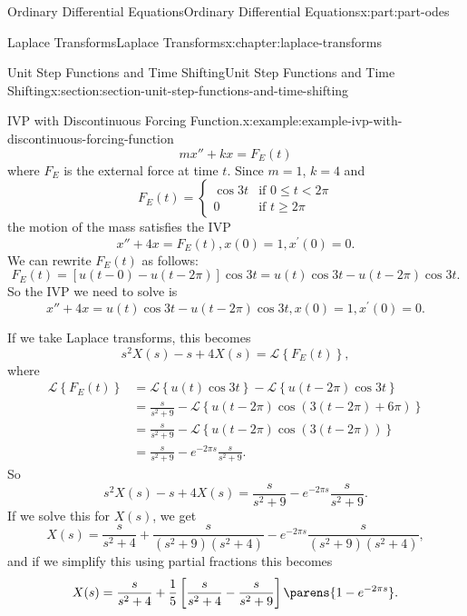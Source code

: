 \documentclass[oneside,10pt,]{book}
\numberwithin{equation}{part}
\newcommand{\Laplace}[1]{\mathcal{L}\left\{#1\right\}}
\newcommand{\lt}{<}
\newcommand{\amp}{&}
\begin{document}
\begin{partptx}{Ordinary Differential Equations}{}{Ordinary Differential Equations}{}{}{x:part:part-odes}
\begin{chapterptx}{Laplace Transforms}{}{Laplace Transforms}{}{}{x:chapter:laplace-transforms}
\begin{sectionptx}{Unit Step Functions and Time Shifting}{}{Unit Step Functions and Time Shifting}{}{}{x:section:section-unit-step-functions-and-time-shifting}
\begin{example}{IVP with Discontinuous Forcing Function.}{x:example:example-ivp-with-discontinuous-forcing-function}
\begin{equation*}
mx''+kx = F_{E}(t)
\end{equation*}
where \(F_{E}\) is the external force at time \(t\). Since \(m = 1\), \(k = 4\) and%
\begin{equation*}
F_{E}(t) = 
\begin{cases}
\cos3t \amp\text{if }0\leq t\lt 2\pi\\
0 \amp\text{if }t\geq2\pi  
\end{cases}
\end{equation*}
the motion of the mass satisfies the IVP%
\begin{equation*}
x''+4x = F_{E}(t), x(0) = 1, x^\prime(0) = 0.
\end{equation*}
We can rewrite \(F_{E}(t)\) as follows:%
\begin{equation*}
F_{E}(t) = [u(t-0)-u(t-2\pi)]\cos3t = u(t)\cos3t - u(t-2\pi)\cos3t.
\end{equation*}
So the IVP we need to solve is%
\begin{equation*}
x''+4x = u(t)\cos3t - u(t-2\pi)\cos3t, x(0) = 1, x^\prime(0) = 0.
\end{equation*}
%
\par
If we take Laplace transforms, this becomes%
\begin{equation*}
s^{2}X(s) - s + 4X(s) = \Laplace{F_{E}(t)},
\end{equation*}
where%
\begin{align*}
\Laplace{F_{E}(t)} \amp= \Laplace{u(t)\cos3t} - \Laplace{u(t-2\pi)\cos3t}\\
\amp= \frac{s}{s^{2}+9} - \Laplace{u(t-2\pi)\cos(3(t-2\pi)+6\pi)}\\
\amp= \frac{s}{s^{2}+9} - \Laplace{u(t-2\pi)\cos(3(t-2\pi))}\\
\amp= \frac{s}{s^{2}+9} - e^{-2\pi s}\frac{s}{s^{2}+9}\text{.}
\end{align*}
So%
\begin{equation*}
s^{2}X(s) - s + 4X(s) = \frac{s}{s^{2}+9} - e^{-2\pi s}\frac{s}{s^{2}+9}.
\end{equation*}
If we solve this for \(X(s)\), we get%
\begin{equation*}
X(s) = \frac{s}{s^{2}+4} + \frac{s}{(s^{2}+9)(s^{2}+4)} - e^{-2\pi s}\frac{s}{(s^{2}+9)(s^{2}+4)},
\end{equation*}
and if we simplify this using partial fractions this becomes%
\begin{equation*}
X(s) = \frac{s}{s^{2}+4} + \frac{1}{5}\left[\frac{s}{s^{2}+4} - \frac{s}{s^{2}+9}\right]\parens{1-e^{-2\pi s}}.

\end{equation*}
\end{example}
\end{sectionptx}
\end{chapterptx}
\end{partptx}
\end{document}
